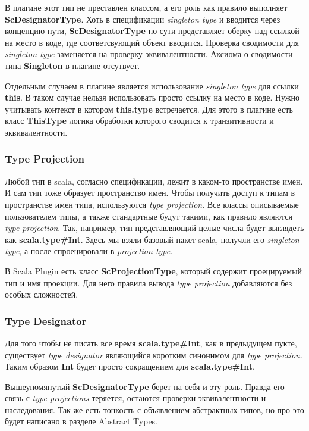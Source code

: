 В плагине этот тип не преставлен классом, а его роль как правило выполняет
\textbf{ScDesignatorType}.
Хоть в спецификации \textit{singleton type} и вводится через концепцию пути,
\textbf{ScDesignatorType} по сути представляет оберку над ссылкой на место в коде,
где соответсвующий объект вводится.
Проверка сводимости для \textit{singleton type}  заменяется на проверку
эквивалентности.
Аксиома о сводимости типа \textbf{Singleton} в плагине отсутвует.

Отдельным случаем в плагине является использование \textit{singleton type} для
ссылки \textbf{this}.
В таком случае нельзя использовать просто ссылку на место в коде.
Нужно учитывать контекст в котором \textbf{this.type} встречается.
Для этого в плагине есть класс \textbf{ThisType} логика обработки которого
сводится к транзитивности и эквивалентности.


\subsubsection{Type Projection}

Любой тип в scala, согласно спецификации, лежит в каком-то пространстве имен.
И сам тип тоже образует пространство имен.
Чтобы получить доступ к типам в пространстве имен типа, используются
\textit{type projection}.
Все классы описываемые пользователем типы, а также стандартные будут такими,
как правило являются \textit{type projection}.
Так, например, тип представляющий целые числа будет выглядеть как
\textbf{scala.type\#Int}.
Здесь мы взяли базовый пакет scala, получли его \textit{singleton type}, а после
спроецировали в \textit{projection type}.

В Scala Plugin есть класс \textbf{ScProjectionType}, который содержит
проецируемый тип и имя проекции.
Для него правила вывода \textit{type projection} добавляются без особых
сложностей.

\subsubsection{Type Designator}
Для того чтобы не писать все время \textbf{scala.type\#Int}, как в предыдущем пукте,
существует \textit{type designator} являющийся коротким синонимом для
\textit{type projection}.
Таким образом \textbf{Int} будет просто сокращением для \textbf{scala.type\#Int}.

Вышеупомянутый \textbf{ScDesignatorType} берет на себя и эту роль.
Правда его связь с \textit{type projections} теряется, остаются проверки
эквивалентности и наследования.
Так же есть тонкость с объявлением абстрактных типов, но про это будет написано
в разделе Abstract Types.

